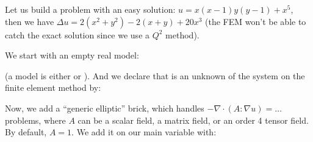 \documentclass[a4paper,11pt,english]{sphinxmanual}
\begin{document}
\sphinxAtStartPar
Let us build a problem with an easy solution: \(u=x(x-1)y(y-1)+x^5\), then we
have \(\Delta u=2(x^2+y^2)-2(x+y)+20x^3\) (the FEM won’t be able to catch the
exact solution since we use a \(Q^2\) method).

\sphinxAtStartPar
We start with an empty real model:

\begin{sphinxVerbatim}[commandchars=\\\{\}]
\end{sphinxVerbatim}

\sphinxAtStartPar
(a model is either  or ). And we declare that  is an
unknown of the system on the finite element method  by:

\begin{sphinxVerbatim}[commandchars=\\\{\}]
\end{sphinxVerbatim}

\sphinxAtStartPar
Now, we add a “generic elliptic” brick, which handles \(-\nabla\cdot(A:\nabla
u) = \ldots\) problems, where \(A\) can be a scalar field, a matrix field, or
an order 4 tensor field. By default, \(A=1\). We add it on our main variable
 with:

\begin{sphinxVerbatim}[commandchars=\\\{\}]
\end{sphinxVerbatim}
\end{document}
